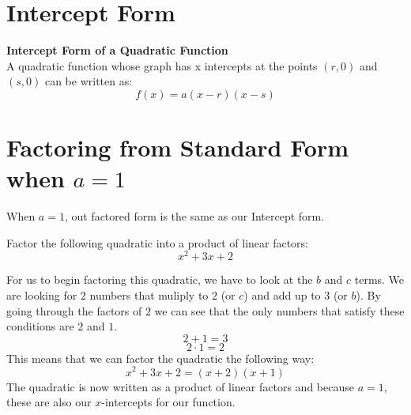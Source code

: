 \documentclass{ximera}
\begin{document}
\section{Intercept Form}
\begin{callout} \textbf{\large{Intercept Form of a Quadratic Function}}\\
          A quadratic function whose graph has x intercepts at the points $(r,0)$ and $(s,0)$ can be written as:\\
\[
f(x)=a(x-r)(x-s)
\]
\end{callout}


\section{Factoring from Standard Form when $a=1$}
When $a=1$, out factored form is the same as our Intercept form.

\begin{example}
Factor the following quadratic into a product of linear factors:
\[
x^2+3x+2
\]

\begin{explanation}
For us to begin factoring this quadratic, we have to look at the $b$ and $c$ terms. We are looking for $2$ numbers that muliply to $2$ (or $c$) and add up to $3$ (or $b$). By going through the factors of $2$ we can see that the only numbers that satisfy these conditions are $2$ and $1$.
\[
2+1=3
\]
\[
2\cdot 1=2
\]
This means that we can factor the quadratic the following way:
\[
x^2+3x+2=(x+2)(x+1)
\]
The quadratic is now written as a product of linear factors and because $a=1$, these are also our $x$-intercepts for our function.
\end{explanation}
\end{example}

\end{document}
